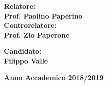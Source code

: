 \begin{titlepage}
\noindent
\begin{minipage}[t]{0.47\textwidth}
{\large{\bf Relatore:\\
 Prof. Paolino Paperino}}
\vspace{8mm}
{\large{\bf \\ Controrelatore:\\
Prof. Zio Paperone}}
\end{minipage}
\hfill
\begin{minipage}[t]{0.47\textwidth}\raggedleft
\vspace{20mm}
{\large{\bf Candidato:\\
Filippo Valle}}
\end{minipage}
\vspace{10mm}
\begin{center}
{\large{\bf 
Anno Accademico 2018/2019}}
\end{center}

\end{titlepage}